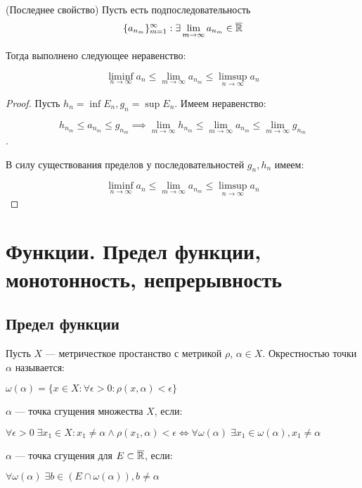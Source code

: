 \begin{theorem} (Последнее свойство)
    Пусть есть подпоследовательность $$\{a_{n_m}\}_{m=1}^{\infty}: \exists \lim_{m \to \infty} a_{n_m} \in \overline{\R}$$

    Тогда выполнено следующее неравенство:

    $$\liminf_{n \to \infty} a_n \leq \lim_{m \to \infty} a_{n_m} \leq \limsup_{n \to \infty} a_n$$
\end{theorem}

\begin{proof}
    Пусть $h_n = \inf E_n, g_n = \sup E_n$. Имеем неравенство:

    $$h_{n_m} \leq a_{n_m} \leq g_{n_m} \implies \lim_{m \to \infty} h_{n_m} \leq \lim_{m \to \infty} a_{n_m} \leq \lim_{m \to \infty} g_{n_m}$$.

    В силу существования пределов у последовательностей $g_n, h_n$ имеем:

    $$\liminf_{n \to \infty} a_n \leq \lim_{m \to \infty} a_{n_m} \leq \limsup_{n \to \infty} a_n$$
\end{proof}

\chapter{Функции. Предел функции, монотонность, непрерывность}

\section{Предел функции}

\begin{definition}
    Пусть $X$ --- метричесткое простанство с метрикой $\rho$, $\alpha \in X$. Окрестностью точки $\alpha$ называется:
    
    $\omega(\alpha) = \{x \in X: \forall \epsilon > 0: \rho(x, \alpha) < \epsilon\}$
\end{definition}

\begin{definition}
    $\alpha$ --- точка сгущения множества $X$, если:

    $\forall \epsilon > 0 \; \exists x_1 \in X: x_1 \neq \alpha \land \rho(x_1, \alpha) < \epsilon \Leftrightarrow \forall \omega(\alpha) \; \exists x_1 \in \omega(\alpha), x_1 \neq \alpha$
\end{definition}

\begin{definition}
    $\alpha$ --- точка сгущения для $E \subset \overline{\mathbb{R}}$, если:

    $\forall \omega(\alpha) \; \exists b \in (E \cap \omega(\alpha)), b \neq \alpha$
\end{definition}

